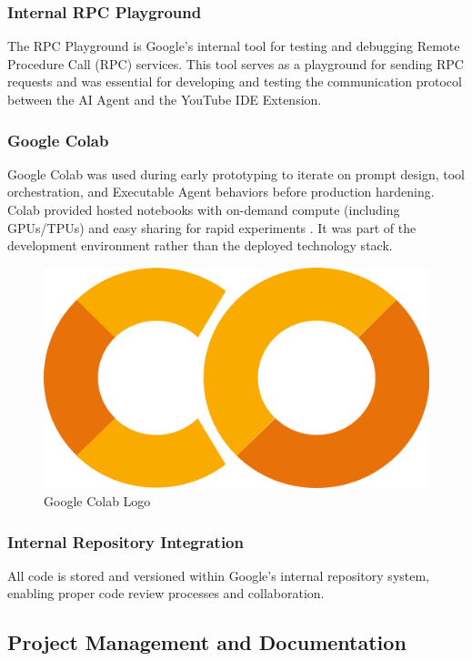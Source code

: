 \begin{spacing}{1.2}
\subsubsection{Internal RPC Playground}
The RPC Playground is Google's internal tool for testing and debugging Remote Procedure Call (RPC) services. This tool serves as a playground for sending RPC requests and was essential for developing and testing the communication protocol between the AI Agent and the YouTube IDE Extension.

\subsubsection{Google Colab}
Google Colab was used during early prototyping to iterate on prompt design, tool orchestration, and Executable Agent behaviors before production hardening. Colab provided hosted notebooks with on-demand compute (including GPUs/TPUs) and easy sharing for rapid experiments \cite{colab2017, jupyter2014}. It was part of the development environment rather than the deployed technology stack.

\begin{figure}[H]
    \centering
    \includegraphics[scale=0.4]{Images/Google_Colab.png}
    \caption{Google Colab Logo}
    \label{fig:google_colab}
\end{figure}

\subsubsection{Internal Repository Integration}
All code is stored and versioned within Google's internal repository system, enabling proper code review processes and collaboration.

\subsection{Project Management and Documentation}


\end{spacing}
